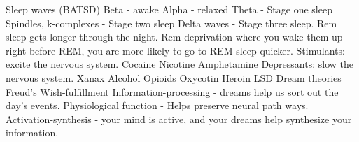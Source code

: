 \markdownRendererUlEndTight \markdownRendererInterblockSeparator
{}\markdownRendererInterblockSeparator
{}\markdownRendererUlBeginTight
\markdownRendererUlItem Sleep waves (BATSD)\markdownRendererInterblockSeparator
{}\markdownRendererUlBeginTight
\markdownRendererUlItem Beta - awake\markdownRendererUlItemEnd 
\markdownRendererUlItem Alpha - relaxed\markdownRendererUlItemEnd 
\markdownRendererUlItem Theta - Stage one sleep\markdownRendererUlItemEnd 
\markdownRendererUlItem Spindles, k-complexes - Stage two sleep\markdownRendererUlItemEnd 
\markdownRendererUlItem Delta waves - Stage three sleep.\markdownRendererUlItemEnd 
\markdownRendererUlEndTight \markdownRendererUlItemEnd 
\markdownRendererUlItem Rem sleep gets longer through the night.\markdownRendererUlItemEnd 
\markdownRendererUlItem Rem deprivation where you wake them up right before REM, you are more likely to go to REM sleep quicker.\markdownRendererUlItemEnd 
\markdownRendererUlEndTight \markdownRendererInterblockSeparator
{}\markdownRendererInterblockSeparator
{}\markdownRendererUlBegin
\markdownRendererUlItem Stimulants: excite the nervous system.\markdownRendererInterblockSeparator
{}\markdownRendererUlBeginTight
\markdownRendererUlItem Cocaine\markdownRendererUlItemEnd 
\markdownRendererUlItem Nicotine\markdownRendererUlItemEnd 
\markdownRendererUlItem Amphetamine\markdownRendererUlItemEnd 
\markdownRendererUlEndTight \markdownRendererUlItemEnd 
\markdownRendererUlItem Depressants: slow the nervous system.\markdownRendererInterblockSeparator
{}\markdownRendererUlBeginTight
\markdownRendererUlItem Xanax\markdownRendererUlItemEnd 
\markdownRendererUlItem Alcohol\markdownRendererUlItemEnd 
\markdownRendererUlItem Opioids\markdownRendererUlItemEnd 
\markdownRendererUlItem Oxycotin\markdownRendererUlItemEnd 
\markdownRendererUlItem Heroin\markdownRendererUlItemEnd 
\markdownRendererUlItem LSD\markdownRendererUlItemEnd 
\markdownRendererUlEndTight \markdownRendererUlItemEnd 
\markdownRendererUlItem Dream theories\markdownRendererInterblockSeparator
{}\markdownRendererUlBeginTight
\markdownRendererUlItem Freud's Wish-fulfillment\markdownRendererUlItemEnd 
\markdownRendererUlItem Information-processing - dreams help us sort out the day's events.\markdownRendererUlItemEnd 
\markdownRendererUlItem Physiological function - Helps preserve neural path ways.\markdownRendererUlItemEnd 
\markdownRendererUlItem Activation-synthesis - your mind is active, and your dreams help synthesize your information.\markdownRendererUlItemEnd 
